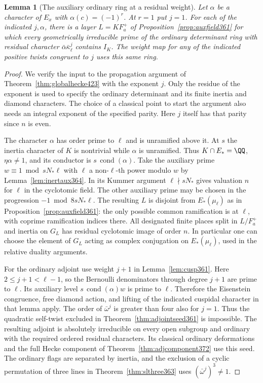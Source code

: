 \documentclass[a4paper,11pt]{article}
\newtheorem{lemma}[proposition]{Lemma}
\theoremstyle{definition}
\theoremstyle{remark}
\numberwithin{equation}{section}
\begin{document}
\begin{lemma}[The auxiliary ordinary ring at a residual weight]\leavevmode
\label{lem:baseweight426}
Let \(\alpha\) be a character of \(E_x\) with
\(\alpha(c)=(-1)^r\). At \(r=1\) put \(j=1\). For each of
the indicated \(j,\alpha\), there is a layer \(L=KF_a^+\)
of Proposition~\ref{prop:auxfield361} for which every
geometrically irreducible prime of the ordinary determinant
ring with residual character \(\bar\alpha\bar\kappa_\ell^j\)
contains \(I_K\). The weight map for any of the indicated
positive twists congruent to \(j\) uses this same ring.
\end{lemma}
\begin{proof}
We verify the input to the propagation argument
of Theorem~\ref{thm:globalhecke423} with the exponent \(j\).
Only the residue of the exponent is used to specify the
ordinary determinant and its finite inertia and diamond
characters. The choice of a classical point to start the
argument also needs an integral exponent of the specified
parity. Here \(j\) itself has that parity since \(n\) is even.

The character \(\alpha\) has order prime to \(\ell\) and is
unramified above it. At \(s\) the inertia character of \(K\)
is nontrivial while \(\alpha\) is unramified. Thus
\(K\cap E_*=\QQ\), \(\eta\alpha\ne1\), and its conductor is
\(s\,\operatorname{cond}(\alpha)\). Take the auxiliary prime
\(w\equiv1\bmod sN_*\ell\) with \(\ell\) a non-\(\ell\)-th
power modulo \(w\) by Lemma~\ref{lem:inertaux364}. In its
Kummer argument \(\ell\nmid sN_*\) gives valuation \(n\)
for \(\ell\) in the cyclotomic field. The other auxiliary
prime may be chosen in the progression
\(-1\bmod 8sN_*\ell\). The resulting \(L\) is disjoint
from \(E_*(\mu_\ell)\) as in Proposition~\ref{prop:auxfield361}:
the only possible common ramification is at \(\ell\), with
coprime ramification indices there. All designated finite
places split in \(L/F_a^+\) and inertia on \(G_L\) has
residual cyclotomic image of order \(n\). In particular one
can choose the element of \(G_L\) acting as complex conjugation
on \(E_*(\mu_\ell)\), used in the relative duality arguments.

For the ordinary adjoint use weight \(j+1\) in
Lemma~\ref{lem:cusp361}. Here \(2\le j+1<\ell-1\), so the
Bernoulli denominators through degree \(j+1\) are prime to
\(\ell\). Its auxiliary level
\(s\,\operatorname{cond}(\alpha)w\) is prime to \(\ell\).
Therefore the Eisenstein congruence, free diamond action,
and lifting of the indicated cuspidal character in that lemma
apply. The order of \(\bar\omega^j\) is greater than four
also for \(j=1\). Thus the quadratic self-twist excluded in
Theorem~\ref{thm:adjointseed361} is impossible. The resulting
adjoint is absolutely irreducible on every open subgroup
and ordinary with the required ordered residual characters.
Its classical ordinary deformations and the full Hecke
component of Theorem~\ref{thm:adjcomponent372} use this
seed. The ordinary flags are separated by inertia, and
the exclusion of a cyclic permutation of three lines in
Theorem~\ref{thm:slthree363} uses
\((\bar\omega^j)^3\ne1\).


\end{proof}
\end{document}
